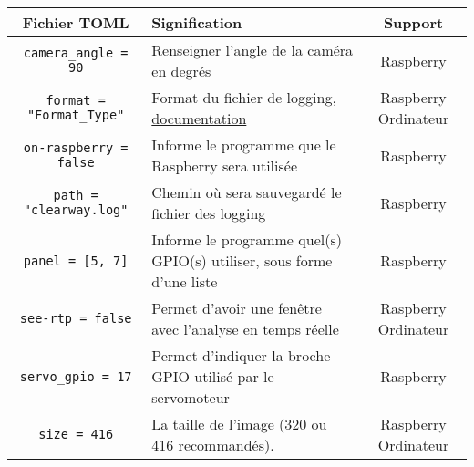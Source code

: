 \begin{table}[H]
    \centering
    \begin{tabularx}{\linewidth}{|c|X|c|}
        \hline
        \rowcolor{tableColorDark} Fichier \textbf{TOML}  & Signification                                                                                                                & Support              \\
        \hline
        \texttt{camera\_angle = 90}                  & Renseigner l'angle de la caméra en degrés                                                                                                                         & Raspberry               \\\hline
        \texttt{format = "Format\_Type"}             & Format du fichier de logging, \href{https://docs.python.org/3/howto/logging-cookbook.html\#formatting-styles}{documentation}                                      & Raspberry Ordinateur    \\\hline
        \texttt{on-raspberry = false}                & Informe le programme que le Raspberry sera utilisée                                                                                                               & Raspberry               \\\hline
        \texttt{path = "clearway.log"}               & Chemin où sera sauvegardé le fichier des logging                                                                                                                  & Raspberry               \\\hline
        \texttt{panel = [5, 7]}                      & Informe le programme quel(s) GPIO(s) utiliser, sous forme d'une liste                                                                                             & Raspberry               \\\hline
        \texttt{see-rtp = false}                     & Permet d'avoir une fenêtre avec l'analyse en temps réelle                                                                                                         & Raspberry Ordinateur    \\\hline
        \texttt{servo\_gpio = 17}                    & Permet d'indiquer la broche GPIO utilisé par le servomoteur                                                                                                       & Raspberry               \\\hline
        \texttt{size = 416}                          & La taille de l'image (320 ou 416 recommandés).                                                                                                                    & Raspberry Ordinateur    \\\hline

\end{tabularx}
\end{table}
